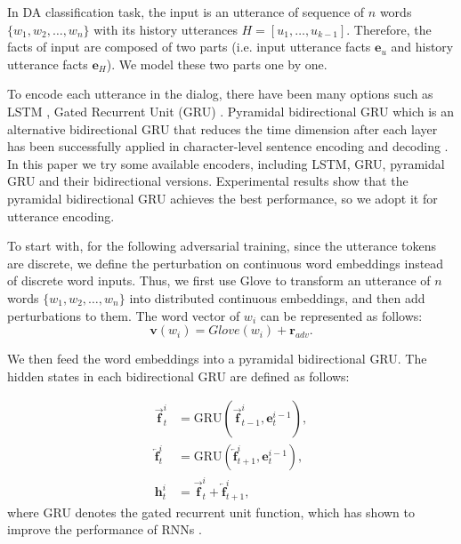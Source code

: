 \documentclass[conference]{IEEEtran}
\begin{document}
	In DA classification task, the input is an utterance of sequence of $n$ words $\{w_1,w_2,\ldots,w_n\}$ with its history utterances $H=[u_1,\ldots,u_{k-1}]$. Therefore, the facts of input are composed of two parts (i.e. input utterance facts $\mathbf{e}_u$ and history utterance facts $\mathbf{e}_H$). We model these two parts one by one. 
	
	To encode each utterance in the dialog, there have been many options such as LSTM \cite{kumar2017dialogue}, Gated Recurrent Unit (GRU) \cite{chung2014empirical, xiong2016dynamic}. 
	Pyramidal bidirectional GRU which is an alternative bidirectional GRU that reduces the time dimension after each layer has been successfully applied in character-level sentence encoding and decoding \cite{chan2016listen}. In this paper we try some available encoders, including LSTM, GRU, pyramidal GRU and their bidirectional versions. Experimental results show that the pyramidal bidirectional GRU achieves the best performance, so we adopt it for utterance encoding.
	
	To start with, for the following adversarial training, since the utterance tokens are discrete, we define the perturbation on continuous word embeddings instead of discrete word inputs. Thus, we first use Glove \cite{pennington2014glove} to transform an utterance of $n$ words $\{w_1,w_2,\ldots,w_n\}$ into distributed continuous embeddings, and then add perturbations to them. The word vector of $w_i$ can be represented as follows:
	\begin{equation}
	\mathbf{v}(w_i) = Glove(w_i) + \mathbf{r}_{adv}.
	\end{equation}
	
	We then feed the word embeddings into a pyramidal bidirectional GRU. The hidden states in each bidirectional GRU are defined as follows:
	
	\begin{align}
	\overrightarrow{\mathbf{f}}_t^i &= \text{GRU}(\overrightarrow{\mathbf{f}}_{t-1}^i, \mathbf{e}_t^{i-1}), \\
	\overleftarrow{\mathbf{f}}_t^i  &= \text{GRU}(\overleftarrow{\mathbf{f}}_{t+1}^i, \mathbf{e}_t^{i-1}), \\
	\mathbf{h}_t^i  &= \overrightarrow{\mathbf{f}}_t^i +\overleftarrow{\mathbf{f}}_{t+1}^i ,
	\end{align}
	where GRU denotes the gated recurrent unit function, which has shown to improve the performance of RNNs \cite{cho2014learning,hochreiter1997long}.
	
\end{document}
